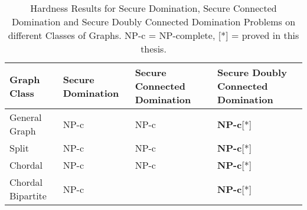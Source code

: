 \begin{table}[H]
\centering
\begin{tabular}{| m{3cm} | m{3.3cm} | m{3.5cm} | m{3.5cm} |}
\hline \hline
\small \textbf{Graph Class} & \small \textbf{Secure Domination} & \small \textbf{Secure Connected Domination} & \small \textbf{Secure Doubly Connected Domination} \\
\hline \hline
General Graph & NP-c \cite{Meroune} & NP-c \cite{pvsr} & \textbf{NP-c}[*] \\ 
\hline
Split &  NP-c \cite{Meroune} & NP-c \cite{pvsr}  &  \textbf{NP-c}[*]\\
\hline
Chordal & NP-c \cite{Meroune} & NP-c \cite{pvsr} & \textbf{NP-c}[*] \\
\hline
Chordal Bipartite & {NP-c} \cite{Brand1} &   & \textbf{NP-c}[*]  \\
\hline
\end{tabular}
\caption{Hardness Results for Secure Domination, Secure Connected Domination and Secure Doubly Connected Domination Problems on different Classes of Graphs. NP-c = NP-complete, [*] = proved in this thesis.}
\end{table}
\noindent
